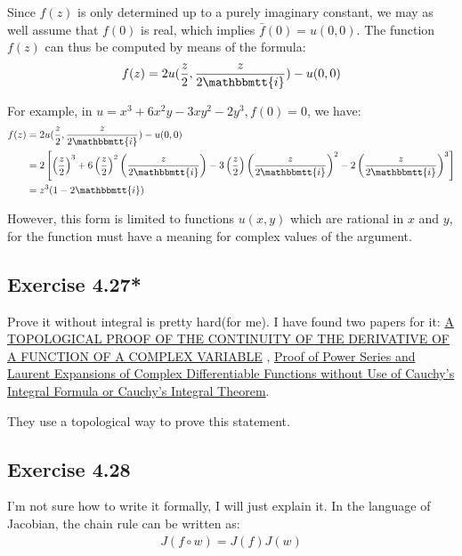 \documentclass[]{ctexart}
\newcommand{\mi}{\mathbbmtt{i}}
\begin{document}
				Since $f(z)$ is only determined up to a purely imaginary constant, we may as well assume that $f(0)$ is real, which implies $\bar{f}(0)=u(0,0) .$ The function $f(z)$ can thus be computed by means of the formula:
					\begin{equation*}
						f(z)=2 u(\frac{z}{2}, \frac{z}{2\mi })-u(0,0)
					\end{equation*}
				
				For example, in $u=x^{3}+6 x^{2} y-3 x y^{2}-2 y^{3}, f(0)=0$, we have:
					\begin{equation*}
					\begin{aligned}
						f(z)&=2 u(\frac{z}{2}, \frac{z}{2\mi })-u(0,0)\\
						&=2\left[\left(\frac{z}{2}\right)^3+6\left(\frac{z}{2}\right)^2\left(\frac{z}{2\mi }\right)-3\left(\frac{z}{2}\right)\left(\frac{z}{2\mi }\right)^2-2\left(\frac{z}{2\mi }\right)^3\right]\\
						&=z^3(1-2\mi)
					\end{aligned}
					\end{equation*}
				
				However, this form is limited to functions $u(x,y)$ which are rational in $x$ and $y$, for the function must have a meaning for complex values of the argument. 			
	\subsection{Exercise 4.27*}
		Prove it without integral is pretty hard(for me). I have found two papers for it:
		\href{https://www.ams.org/journals/bull/1959-65-01/S0002-9904-1959-10251-2/S0002-9904-1959-10251-2.pdf}{A TOPOLOGICAL PROOF OF THE CONTINUITY OF THE DERIVATIVE OF A FUNCTION OF A COMPLEX VARIABLE} , \href{https://www.sciencedirect.com/science/article/pii/0021904589900518}{Proof of Power Series and Laurent Expansions of Complex Differentiable Functions without Use of Cauchy's Integral Formula or Cauchy's Integral Theorem}. 
		
		They use a topological way to prove this statement.
	
	\subsection{Exercise 4.28} 
		I'm not sure how to write it formally, I will just explain it. In the language of Jacobian, the chain rule can be written as:
			\begin{equation*}
			\begin{aligned}
				J(f\circ w)=J(f)J(w)
			\end{aligned}
			\end{equation*}
		
\end{document}
